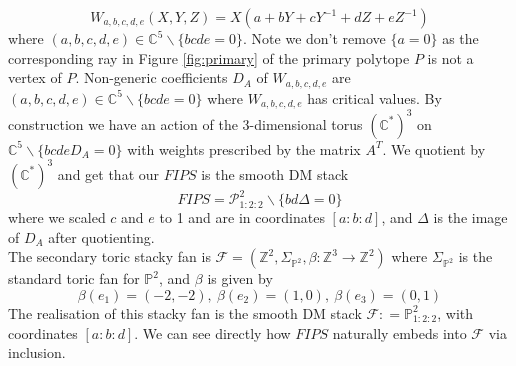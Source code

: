 \documentclass[oneside]{amsart}
\theoremstyle{definition}
\theoremstyle{definition}
\theoremstyle{definition}
\theoremstyle{definition}
\newcommand{\defeq}{\mathrel{\mathop:}=}
\newcommand{\CC}{\mathbb{C}}
\newcommand{\PP}{\mathbb{P}}
\newcommand{\Z}{\mathbb{Z}}
\begin{document}
\begin{equation*}
    W_{a,b,c,d,e}(X,Y,Z) = X\left(a + bY + cY^{-1} + d Z + e Z^{-1}\right)
\end{equation*}
where $(a,b,c,d,e) \in \CC^5 \backslash \{ bcde = 0\}$. Note we don't remove $\{a=0 \}$ as the corresponding ray in Figure \ref{fig:primary} of the primary polytope $P$ is not a vertex of $P$. Non-generic coefficients $D_A$ of $W_{a,b,c,d,e}$ are $(a,b,c,d,e) \in \CC^5 \backslash \{ bcde = 0\}$ where $W_{a,b,c,d,e}$ has critical values. By construction we have an action of the 3-dimensional torus $(\CC^*)^3$ on $\CC^5 \backslash \{ bcdeD_A = 0\}$ with weights prescribed by the matrix $A^T$. We quotient by $(\CC^*)^3$ and get that our $FIPS$ is the smooth DM stack
$$
FIPS = \mathcal{P}^2_{1:2:2}\backslash \{bd\Delta = 0\}
$$
where we scaled $c$ and $e$ to 1 and are in coordinates $[a:b:d]$, and $\Delta$ is the image of $D_A$ after quotienting. \\
\newline
The secondary toric stacky fan is $\mathcal{F} = (\Z^2, \Sigma_{\PP^2},\beta : \Z^3 \to \Z^2)$ where $\Sigma_{\PP^2}$ is the standard toric fan for $\PP^2$, and $\beta$ is given by
$$
\beta(e_1)= (-2,-2), \: \beta(e_2) = (1,0), \: \beta(e_3) = (0,1)
$$
The realisation of this stacky fan is the smooth DM stack $\mathcal{F} \defeq \PP^2_{1:2:2}$, with coordinates $[a:b:d]$. We can see directly how $FIPS$ naturally embeds into $\mathcal{F}$ via inclusion. 
\end{document}
